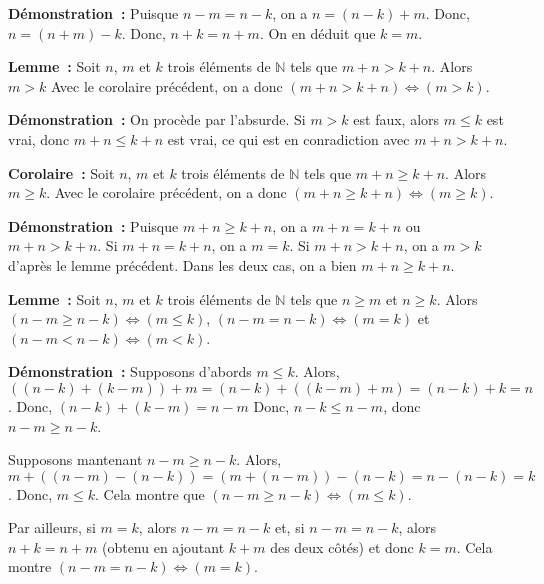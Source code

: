 \medskip

\noindent\textbf{Démonstration :} Puisque $n - m = n - k$, on a $n = (n - k) + m$.
    Donc, $n = (n + m) - k$. 
    Donc, $n + k = n + m$.
    On en déduit que $k = m$.

    \done

\medskip

\noindent\textbf{Lemme :} Soit $n$, $m$ et $k$ trois éléments de $\mathbb{N}$ tels que $m+n > k+n$. 
    Alors $m > k$
    Avec le corolaire précédent, on a donc $(m+n > k+n) \Leftrightarrow (m > k)$.

\medskip

\noindent\textbf{Démonstration :} 
    On procède par l'absurde. 
    Si $m > k$ est faux, alors $m \leq k$ est vrai, donc $m + n \leq k + n$ est vrai, ce qui est en conradiction avec $m+n > k+n$.

   \done 

\medskip

\noindent\textbf{Corolaire :} Soit $n$, $m$ et $k$ trois éléments de $\mathbb{N}$ tels que $m+n \geq k+n$. 
    Alors $m \geq k$.
    Avec le corolaire précédent, on a donc $(m+n \geq k+n) \Leftrightarrow (m \geq k)$.

\medskip

\noindent\textbf{Démonstration :} 
    Puisque $m + n \geq k + n$, on a $m + n = k + n$ ou $m + n > k + n$.
    Si $m + n = k + n$, on a $m = k$.
    Si $m + n > k + n$, on a $m > k$ d'après le lemme précédent.
    Dans les deux cas, on a bien $m + n \geq k + n$.

   \done 

\medskip

\noindent\textbf{Lemme :} Soit $n$, $m$ et $k$ trois éléments de $\mathbb{N}$ tels que $n \geq m$ et $n \geq k$. 
    Alors $(n-m \geq n-k) \Leftrightarrow (m \leq k)$, $(n-m = n-k) \Leftrightarrow (m = k)$ et $(n-m < n-k) \Leftrightarrow (m < k)$.

\medskip

\noindent\textbf{Démonstration :} 
    Supposons d'abords $m \leq k$. 
    Alors, $((n-k) + (k-m)) + m = (n-k) + ((k-m) + m) = (n-k) + k = n$. 
    Donc, $(n-k) + (k-m) = n - m$
    Donc, $n-k \leq n-m$, donc $n-m \geq n-k$. 

    Supposons mantenant $n-m \geq n-k$. 
    Alors, $m + ((n-m) - (n-k)) = (m + (n-m)) - (n-k) = n - (n-k) = k$. 
    Donc, $m \leq k$.
    Cela montre que $(n-m \geq n-k) \Leftrightarrow (m \leq k)$.
    
    Par ailleurs, si $m = k$, alors $n-m = n-k$ et, si $n - m = n - k$, alors $n + k = n + m$ (obtenu en ajoutant $k+m$ des deux côtés) et donc $k = m$. 
    Cela montre $(n-m = n-k) \Leftrightarrow (m = k)$. 

